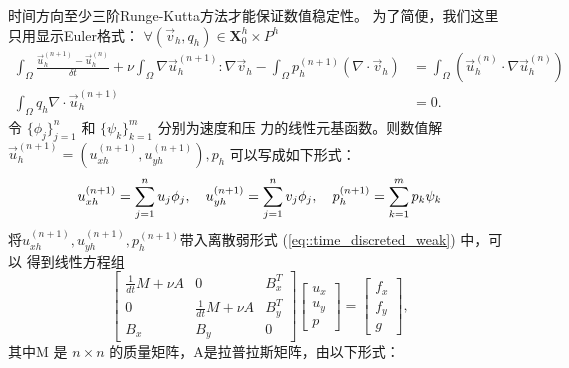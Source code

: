 \documentclass{report}
\theoremstyle{Remark}
\begin{document}
   时间方向至少三阶Runge-Kutta方法才能保证数值稳定性。
   为了简便，我们这里只用显示Euler格式：
   $\forall (\vec{v}_h, q_h) \in \mathbf{X}_0^h \times P^h$
   \begin{equation}
     \begin{aligned}
       \int_{\Omega} \frac{\vec{u}_h^{(n + 1)} -
         \vec{u}_h^{(n)}}{\delta t} + \nu \int_{\Omega} \nabla
       \vec{u}_h^{(n + 1)} : \nabla \vec{v}_h - \int_{\Omega} p_h^{(n
         + 1)} \left( \nabla \cdot \vec{v}_h \right)
       & = \int_{\Omega} \left( \vec{u}_h^{(n)} \cdot \nabla \vec{u}_h^{(n)}
       \right) &\\
       \int_{\Omega} q_h \nabla \cdot \vec{u}_h^{(n + 1)} & = 0.&
     \end{aligned}
     \label{eq::time_discreted_weak}
   \end{equation}
   令 $\{\phi_j \}_{j = 1}^n$ 和 $\{\psi_k\}_{k = 1}^m$ 分别为速度和压
   力的线性元基函数。则数值解$\vec{u}_h^{(n + 1)} = (u_{xh}^{(n + 1)},
   u_{yh}^{(n + 1)}), p_h$ 可以写成如下形式：
   \begin{equation}
     u_{xh}^{(n + 1)} = \sum_{j = 1}^n u_j \phi_j, \quad u_{yh}^{(n +
       1)} = \sum_{j = 1}^n v_j \phi_j, \quad p_h^{(n + 1)} = \sum_{k
       = 1}^m p_k \psi_k \notag
   \end{equation}
   将$u_{xh}^{(n + 1)}, u_{yh}^{(n + 1)}, p_h^{(n + 1)}$带入离散弱形式
   (\ref{eq::time_discreted_weak}) 中，可以
   得到线性方程组
   \begin{equation}
     \left[
       \begin{array}{lll}
         \frac{1}{dt} M + \nu A & 0 & B_x^T \\
         0 & \frac{1}{dt} M +\nu A  & B_y^T \\
         B_x & B_y & 0
       \end{array}
     \right]
     \left[
       \begin{array}{c}
         u_x \\
         u_y \\
         p
       \end{array}
     \right] = 
     \left[
       \begin{array}{c}
         f_x \\
         f_y \\
         g
       \end{array}
     \right],
     \label{eq::linear_system}
   \end{equation}
   其中M 是 $n \times n$ 的质量矩阵，A是拉普拉斯矩阵，由以下形式：
\end{document}
